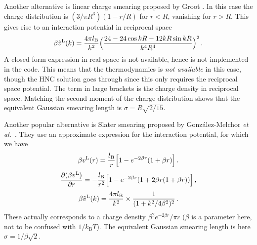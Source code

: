 \documentclass[12pt,a4paper]{article}
\newcommand{\latin}[1]{\emph{#1}}
\newcommand{\etal}{\latin{et al.}}
\newcommand{\kB}{k_{\mathrm{B}}}
\newcommand{\kT}{\kB T}
\newcommand{\lr}{^{\mathrm{L}}}
\begin{document}
Another alternative is linear charge smearing proposed by Groot
\cite{Groot03}.  In this case the charge distribution is $(3/\pi
R^3)(1-r/R)$ for $r<R$, vanishing for $r>R$. This gives rise to an
interaction potential in reciprocal space \cite{WV14}
%
\begin{equation}
\beta {\tilde v}\lr(k)=\frac{4\pi\lB}{k^2}
\Bigl(\frac{24-24\cos kR-12kR\sin kR}{k^4R^4}\Bigr)^2\,.
\end{equation}
%
A closed form expression in real space is not available, hence is not
implemented in the code.  This means that the thermodynamics is
\emph{not available} in this case, though the HNC solution goes
through since this only requires the reciprocal space potential.  The
term in large brackets is the charge density in reciprocal space.
Matching the second moment of the charge distribution \cite{WV14}
shows that the equivalent Gaussian smearing length is
$\sigma=R\sqrt{2/15}$.

Another popular alternative is Slater smearing proposed by
Gonz\'alez-Melchor \etal\ \cite{GM+06}.  They use an approximate
expression for the interaction potential, for which we have
%
\begin{equation}
  \beta v\lr(r)=\frac{\lB}{r}\Bigl[1-e^{-2\beta r}(1+\beta r)\Bigr]\,.
  \label{eq:slaterapprox}
\end{equation}
%
\begin{equation}
  \frac{\partial(\beta v\lr)}{\partial r}=
  -\frac{\lB}{r^2}\Bigl[1-e^{-2\beta r}(1+2\beta r(1+\beta r))\Bigr]\,,
\end{equation}
%
\begin{equation}
\beta {\tilde v}\lr(k)=\frac{4\pi\lB}{k^2}\times\frac{1}{(1+k^2/4\beta^2)^2}\,.
\end{equation}
%
These actually corresponds to a charge density $\beta^2 e^{-2\beta
  r}/\pi r$ ($\beta$ is a parameter here, not to be confused with
$1/\kT$). The equivalent Gaussian smearing length is here
$\sigma=1/\beta\sqrt{2}$.
\end{document}
